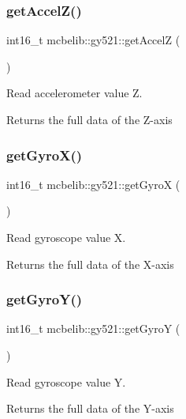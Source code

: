 \subsubsection{\texorpdfstring{get\+Accel\+Z()}{getAccelZ()}}
{\footnotesize\ttfamily int16\+\_\+t mcbelib\+::gy521\+::get\+AccelZ (\begin{DoxyParamCaption}{ }\end{DoxyParamCaption})}



Read accelerometer value Z. 

Returns the full data of the Z-\/axis \mbox{\label{classmcbelib_1_1gy521_a1145cda6295287a6cda950c156bcf0d9}} 
\subsubsection{\texorpdfstring{get\+Gyro\+X()}{getGyroX()}}
{\footnotesize\ttfamily int16\+\_\+t mcbelib\+::gy521\+::get\+GyroX (\begin{DoxyParamCaption}{ }\end{DoxyParamCaption})}



Read gyroscope value X. 

Returns the full data of the X-\/axis \mbox{\label{classmcbelib_1_1gy521_a8b9cec4004f71c70c3a14b5f6fbf9e4d}} 
\subsubsection{\texorpdfstring{get\+Gyro\+Y()}{getGyroY()}}
{\footnotesize\ttfamily int16\+\_\+t mcbelib\+::gy521\+::get\+GyroY (\begin{DoxyParamCaption}{ }\end{DoxyParamCaption})}



Read gyroscope value Y. 

Returns the full data of the Y-\/axis \mbox{\label{classmcbelib_1_1gy521_a197222a217acdbf8260e9495120497a0}} 
